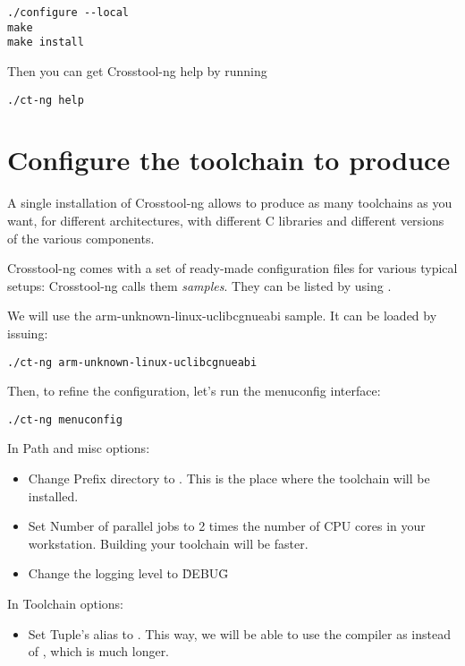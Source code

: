 \begin{verbatim}
./configure --local
make
make install
\end{verbatim}

Then you can get Crosstool-ng help by running

\begin{verbatim}
./ct-ng help
\end{verbatim}

\section{Configure the toolchain to produce}

A single installation of Crosstool-ng allows to produce as many
toolchains as you want, for different architectures, with different C
libraries and different versions of the various components.

Crosstool-ng comes with a set of ready-made configuration files for
various typical setups: Crosstool-ng calls them {\em samples}. They can be
listed by using .

We will use the arm-unknown-linux-uclibcgnueabi sample. It can be loaded by issuing:

\begin{verbatim}
./ct-ng arm-unknown-linux-uclibcgnueabi
\end{verbatim}

Then, to refine the configuration, let's run the menuconfig interface:

\begin{verbatim}
./ct-ng menuconfig
\end{verbatim}

In Path and misc options:

\begin{itemize}
\item Change Prefix directory to
  . This is the place where
  the toolchain will be installed.
\item Set Number of parallel jobs to 2 times the number of CPU cores
  in your workstation. Building your toolchain will be faster.
\item Change the logging level to \"DEBUG\"
\end{itemize}

In Toolchain options:
\begin{itemize}
\item Set Tuple's alias to . This way, we will be able
  to use the compiler as  instead of
  , which is much longer.
\end{itemize}


